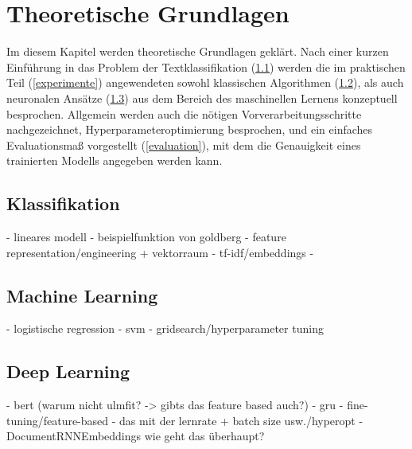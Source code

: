 \chapter{Theoretische Grundlagen}
\label{grundlagen}

Im diesem Kapitel werden theoretische Grundlagen geklärt. Nach einer kurzen Einführung in das Problem der Textklassifikation (\ref{klassifikation}) werden die im praktischen Teil (\ref{experimente}) angewendeten sowohl klassischen Algorithmen (\ref{machine}), als auch neuronalen Ansätze (\ref{deep}) aus dem Bereich des maschinellen Lernens konzeptuell besprochen. Allgemein werden auch die nötigen Vorverarbeitungsschritte nachgezeichnet, Hyperparameteroptimierung besprochen, und ein einfaches Evaluationsmaß vorgestellt (\ref{evaluation}), mit dem die Genauigkeit eines trainierten Modells angegeben werden kann. 


\section{Klassifikation}
\label{klassifikation}

- lineares modell
- beispielfunktion von goldberg
- feature representation/engineering + vektorraum
- tf-idf/embeddings
-


\section{Machine Learning}
\label{machine}

- logistische regression
- svm
- gridsearch/hyperparameter tuning


\section{Deep Learning}
\label{deep}

- bert (warum nicht ulmfit? -> gibts das feature based auch?)
- gru
- fine-tuning/feature-based
- das mit der lernrate + batch size usw./hyperopt
- DocumentRNNEmbeddings wie geht das überhaupt?



